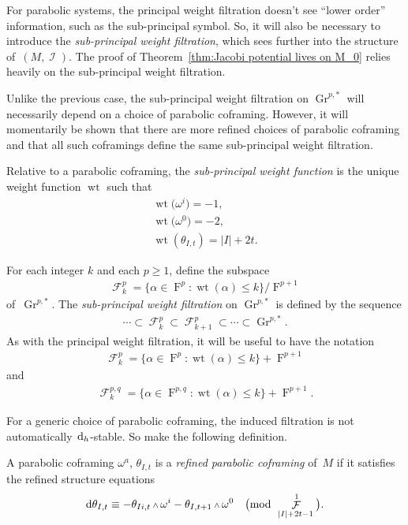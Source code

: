 \documentclass[10pt,a4paper]{amsart}
\DeclareMathOperator{\Gr}{Gr}
\DeclareMathOperator{\I}{\mathcal{I}}
\renewcommand{\d}{{\rm d}}
\renewcommand{\mod}[1]{\quad\big(\mathrm{mod\enspace} #1\big)}
\newcommand{\w}{{\mathchoice{\,{\scriptstyle\wedge}\,}{{\scriptstyle\wedge}}
 {{\scriptscriptstyle\wedge}}{{\scriptscriptstyle\wedge}}}}
\newcommand{\thetas}[1]{\theta_{#1}}
\DeclareMathOperator{\pwf}{F}
\DeclareMathOperator{\swf}{\mathcal{F}}
\DeclareMathOperator{\wt}{\mathrm{wt}}
\renewcommand{\dh}{\ensuremath{\hspace{1pt} \d_h}}
\numberwithin{equation}{section}
\begin{document}
\begin{Example}
 For parabolic systems, the principal weight filtration doesn't see ``lower order'' information, such as the sub-principal symbol. So, it will also be necessary to introduce the \emph{sub-principal weight filtration}, which sees further into the structure of~$(M,\I)$. The proof of Theorem~\ref{thm:Jacobi potential lives on M_0} relies heavily on the sub-principal weight filtration.

 Unlike the previous case, the sub-principal weight filtration on $\Gr^{p,*}$ will necessarily depend on a choice of parabolic coframing. However, it will momentarily be shown that there are more refined choices of parabolic coframing and that all such coframings define the same sub-principal weight filtration.

 Relative to a parabolic coframing, the \emph{sub-principal weight function} is the unique weight function $\wt$ such that
 \begin{gather*}
 \wt\big(\omega^i\big) = -1, \\
 \wt\big(\omega^0\big) = -2, \\
 \wt(\thetas{I,t}) = |I| + 2t .
 \end{gather*}

 For each integer $k$ and each $p \ge 1$, define the subspace
 \begin{gather*}
 \swf^p_k = \big\{ \alpha \in \pwf^p \colon \wt(\alpha) \le k \big\}/ \pwf^{p+1}
 \end{gather*}
 of~$\Gr^{p,*}$.
 The \emph{sub-principal weight filtration} on $\Gr^{p,*}$ is defined by the sequence
 \begin{gather*}
 \cdots \subset \swf^p_k \subset \swf^p_{k+1} \subset \cdots \subset \Gr^{p,*} .
 \end{gather*}
 As with the principal weight filtration, it will be useful to have the notation
 \begin{gather*}
 \swf^p_k = \big\{ \alpha \in \pwf^p \colon \wt(\alpha) \le k \big\} + \pwf^{p+1}
 \end{gather*}
 and
 \begin{gather*}
 \swf^{p,q}_k = \big\{ \alpha \in \pwf^{p,q} \colon \wt(\alpha) \le k \big\} + \pwf^{p+1} .
 \end{gather*}

 For a generic choice of parabolic coframing, the induced filtration is not automatically $\dh$-stable. So make the following definition.
 \begin{Definition}
 A parabolic coframing $\omega^a$, $\thetas{I,t}$ is a \emph{refined parabolic coframing} of~$M$ if it satisfies the refined structure equations
 \begin{gather}\label{eq:refined structure eqs}
 \d\thetas{I,t} \equiv -\thetas{Ii,t}\w\omega^i -\thetas{I,t+1}\w\omega^0 \mod{\swf^1_{|I|+2t-1}}.
 \end{gather}
 \end{Definition}


\end{Example}
\end{document}
